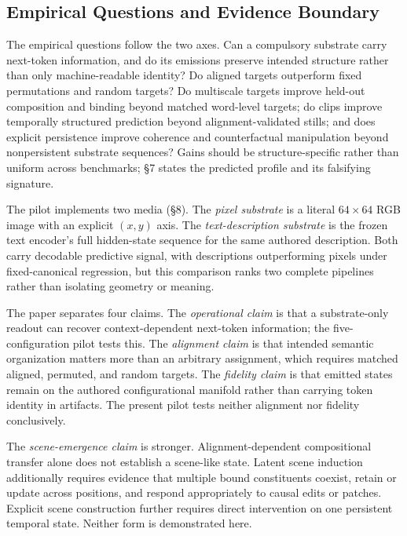 \documentclass[11pt,a4paper]{article}
\begin{document}
\subsection{Empirical Questions and Evidence Boundary}

The empirical questions follow the two axes. Can a compulsory substrate carry next-token information, and do its emissions preserve intended structure rather than only machine-readable identity? Do aligned targets outperform fixed permutations and random targets? Do multiscale targets improve held-out composition and binding beyond matched word-level targets; do clips improve temporally structured prediction beyond alignment-validated stills; and does explicit persistence improve coherence and counterfactual manipulation beyond nonpersistent substrate sequences? Gains should be structure-specific rather than uniform across benchmarks; §7 states the predicted profile and its falsifying signature.

The pilot implements two media (§8). The \emph{pixel substrate} is a literal $64{\times}64$ RGB image with an explicit $(x,y)$ axis. The \emph{text-description substrate} is the frozen text encoder's full hidden-state sequence for the same authored description. Both carry decodable predictive signal, with descriptions outperforming pixels under fixed-canonical regression, but this comparison ranks two complete pipelines rather than isolating geometry or meaning.

The paper separates four claims. The \emph{operational claim} is that a substrate-only readout can recover context-dependent next-token information; the five-configuration pilot tests this. The \emph{alignment claim} is that intended semantic organization matters more than an arbitrary assignment, which requires matched aligned, permuted, and random targets. The \emph{fidelity claim} is that emitted states remain on the authored configurational manifold rather than carrying token identity in artifacts. The present pilot tests neither alignment nor fidelity conclusively.

The \emph{scene-emergence claim} is stronger. Alignment-dependent compositional transfer alone does not establish a scene-like state. Latent scene induction additionally requires evidence that multiple bound constituents coexist, retain or update across positions, and respond appropriately to causal edits or patches. Explicit scene construction further requires direct intervention on one persistent temporal state. Neither form is demonstrated here.
\end{document}
